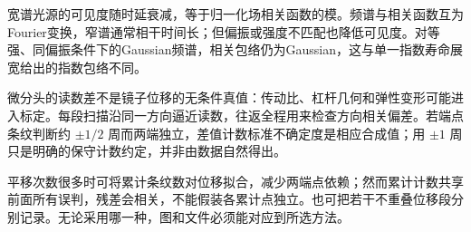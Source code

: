 宽谱光源的可见度随时延衰减，等于归一化场相关函数的模。频谱与相关函数互为Fourier变换，窄谱通常相干时间长；但偏振或强度不匹配也降低可见度。对等强、同偏振条件下的Gaussian频谱，相关包络仍为Gaussian，这与单一指数寿命展宽给出的指数包络不同。

微分头的读数差不是镜子位移的无条件真值：传动比、杠杆几何和弹性变形可能进入标定。每段扫描沿同一方向逼近读数，往返全程用来检查方向相关偏差。若端点条纹判断约 $\pm1/2$ 周而两端独立，差值计数标准不确定度是相应合成值；用 $\pm1$ 周只是明确的保守计数约定，并非由数据自然得出。

平移次数很多时可将累计条纹数对位移拟合，减少两端点依赖；然而累计计数共享前面所有误判，残差会相关，不能假装各累计点独立。也可把若干不重叠位移段分别记录。无论采用哪一种，图和文件必须能对应到所选方法。
